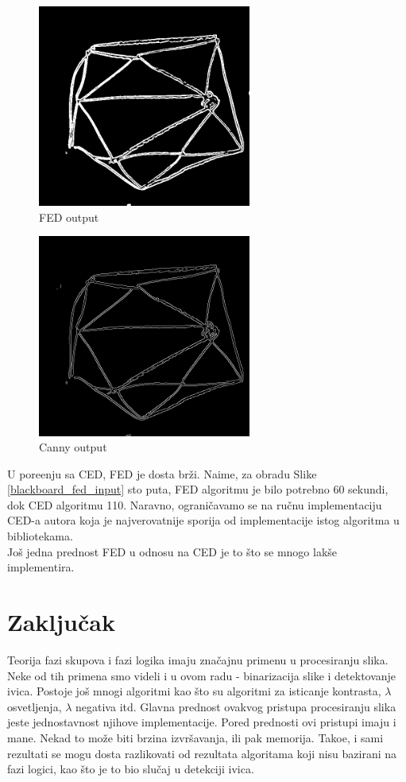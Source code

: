 \documentclass[12pt,a4paper]{article}
\theoremstyle{definition}
\theoremstyle{remark}
\theoremstyle{plain}
\begin{document}
\begin{multicols}{2}
\begin{figure}[H]
\centering
\includegraphics[width=7cm]{images/fuzzy.png}
  \caption{FED output}
\end{figure}

\columnbreak

\begin{figure}[H]
\centering
\includegraphics[width=7cm]{images/canny.png}
  \caption{Canny output}
\end{figure}
\end{multicols}

U pore\dj enju sa CED, FED je dosta br\v zi. Naime, za obradu Slike \ref{blackboard_fed_input} sto puta, FED algoritmu je bilo potrebno 60 sekundi, dok CED algoritmu 110. Naravno, ograni\v cavamo se na ru\v cnu implementaciju CED-a autora koja je najverovatnije sporija od implementacije istog algoritma u bibliotekama.\\

Jo\v s jedna prednost FED u odnosu na CED je to \v sto se mnogo lak\v se implementira.

\section{Zaklju\v cak}
Teorija fazi skupova i fazi logika imaju zna\v cajnu primenu u procesiranju slika. Neke od tih primena smo videli i u ovom radu - binarizacija slike i detektovanje ivica. Postoje jo\v s mnogi algoritmi kao \v sto su algoritmi za isticanje kontrasta, $\lambda$ osvetljenja, $\lambda$ negativa itd.  Glavna prednost ovakvog pristupa procesiranju slika jeste jednostavnost njihove implementacije. Pored prednosti ovi pristupi imaju i mane. Nekad to mo\v ze biti brzina izvr\v savanja, ili pak memorija. Tako\dj e, i sami rezultati se mogu dosta razlikovati od rezultata algoritama koji nisu bazirani na fazi logici, kao \v sto je to bio slu\v caj u detekciji ivica.
\end{document}
